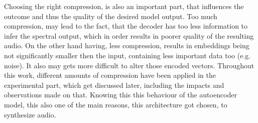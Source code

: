 Choosing the right compression, is also an important part, that influences the outcome and thus the quality of the desired model output. Too much compression, may lead to the fact, that the decoder has too less information to infer the spectral output, which in order results in poorer quality of the resulting audio. On the other hand having, less compression, results in embeddings being not significantly smaller then the input, containing less important data too (e.g. noise). It also may gets more difficult to alter those encoded vectors. Throughout this work, different amounts of compression have been applied in the experimental part, which get discussed later, including the impacts and observations made on that. Knowing this this behaviour of the autoencoder model, this also one of the main reasons, this architecture got chosen, to synthesize audio. \\


